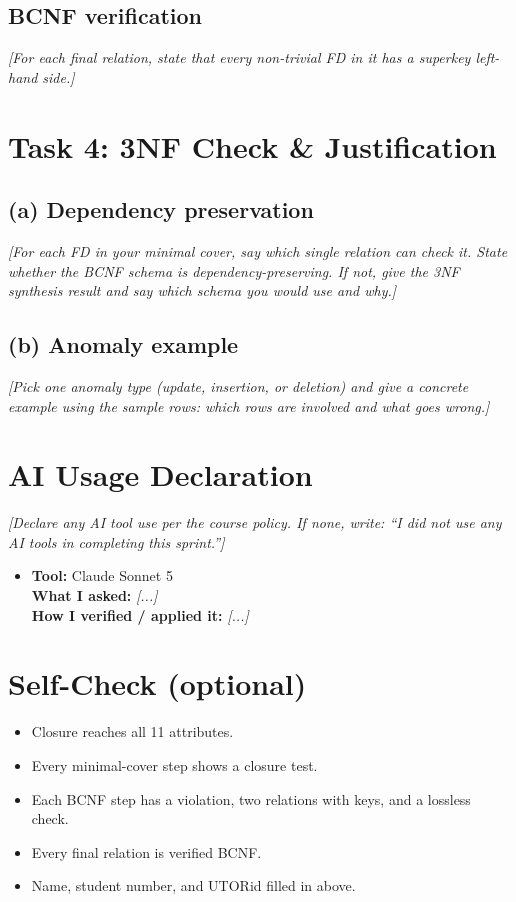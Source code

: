 \documentclass[11pt, letterpaper]{article}
\newcommand{\todo}[1]{{\color{muted}\textit{[#1]}}}    %
\begin{document}
\subsection*{BCNF verification}
\todo{For each final relation, state that every non-trivial FD in it has a superkey left-hand side.}

\section{Task 4: 3NF Check \& Justification}

\subsection*{(a) Dependency preservation}
\todo{For each FD in your minimal cover, say which single relation can check it. State whether the BCNF schema is dependency-preserving. If not, give the 3NF synthesis result and say which schema you would use and why.}

\subsection*{(b) Anomaly example}
\todo{Pick one anomaly type (update, insertion, or deletion) and give a concrete example using the sample rows: which rows are involved and what goes wrong.}

\section{AI Usage Declaration}

\todo{Declare any AI tool use per the course policy. If none, write: ``I did not use any AI tools in completing this sprint.''}

\begin{itemize}
  \item \textbf{Tool:} Claude Sonnet 5 \\
        \textbf{What I asked:} \todo{...} \\
        \textbf{How I verified / applied it:} \todo{...}
\end{itemize}

\section{Self-Check (optional)}

\begin{itemize}[itemsep=1pt]
  \item[$\square$] Closure reaches all 11 attributes.
  \item[$\square$] Every minimal-cover step shows a closure test.
  \item[$\square$] Each BCNF step has a violation, two relations with keys, and a lossless check.
  \item[$\square$] Every final relation is verified BCNF.
  \item[$\square$] Name, student number, and UTORid filled in above.
\end{itemize}
\end{document}
